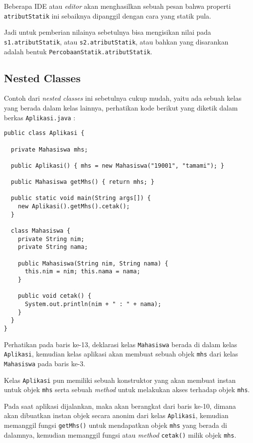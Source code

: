 Beberapa IDE atau \textit{editor} akan menghasilkan sebuah pesan bahwa properti \texttt{atributStatik} ini sebaiknya dipanggil dengan cara yang statik pula.

Jadi untuk pemberian nilainya sebetulnya bisa mengisikan nilai pada \texttt{s1.atributStatik}, atau \texttt{s2.atributStatik}, atau bahkan yang disarankan adalah bentuk \texttt{PercobaanStatik.atributStatik}. 

\subsection{Nested Classes}

Contoh dari \textit{nested classes} ini sebetulnya cukup mudah, yaitu ada sebuah kelas yang berada dalam kelas lainnya, perhatikan kode berikut yang diketik dalam berkas \texttt{Aplikasi.java} :

\begin{lstlisting}
public class Aplikasi {

  private Mahasiswa mhs;

  public Aplikasi() { mhs = new Mahasiswa("19001", "tamami"); }

  public Mahasiswa getMhs() { return mhs; }

  public static void main(String args[]) {
    new Aplikasi().getMhs().cetak();
  }

  class Mahasiswa {
    private String nim;
    private String nama;

    public Mahasiswa(String nim, String nama) {
      this.nim = nim; this.nama = nama;
    }

    public void cetak() {
      System.out.println(nim + " : " + nama);
    }
  }
}
\end{lstlisting}

Perhatikan pada baris ke-13, deklarasi kelas \texttt{Mahasiswa} berada di dalam kelas \texttt{Aplikasi}, kemudian kelas aplikasi akan membuat sebuah objek \texttt{mhs} dari kelas \texttt{Mahasiswa} pada baris ke-3. 

Kelas \texttt{Aplikasi} pun memiliki sebuah konstruktor yang akan membuat instan untuk objek \texttt{mhs} serta sebuah \textit{method} untuk melakukan akses terhadap objek \texttt{mhs}.

Pada saat aplikasi dijalankan, maka akan berangkat dari baris ke-10, dimana akan dibuatkan instan objek secara anonim dari kelas \texttt{Aplikasi}, kemudian memanggil fungsi \texttt{getMhs()} untuk mendapatkan objek \texttt{mhs} yang berada di dalamnya, kemudian memanggil fungsi atau \textit{method} \texttt{cetak()} milik objek \texttt{mhs}.

